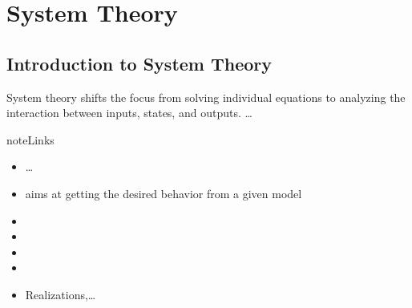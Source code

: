 \documentclass[letterpaper,10pt,english]{jupyterBook}
\begin{document}
\sphinxstepscope


\part{System Theory}

\sphinxstepscope


\chapter{Introduction to System Theory}
\label{\detokenize{ch/system-theory/intro:introduction-to-system-theory}}\label{\detokenize{ch/system-theory/intro:system-theory-intro}}\label{\detokenize{ch/system-theory/intro::doc}}
\sphinxAtStartPar
System theory shifts the focus from solving individual equations to analyzing the interaction between inputs, states, and outputs. …

\begin{sphinxadmonition}{note}{Links}
\begin{itemize}
\item {} 
\sphinxAtStartPar
{\hyperref[\detokenize{ch/ode/intro:ode-intro}]{}} …

\item {} 
\sphinxAtStartPar
{\hyperref[\detokenize{ch/control/intro:control-intro}]{}} aims at getting the desired behavior from a given model

\end{itemize}
\end{sphinxadmonition}
\begin{itemize}
\item {} 
\sphinxAtStartPar
{}

\item {} 
\sphinxAtStartPar
{}

\item {} 
\sphinxAtStartPar
{}

\item {} 
\sphinxAtStartPar
{}

\item {} 
\sphinxAtStartPar
{} Realizations,…

\end{itemize}
\end{document}
